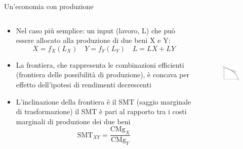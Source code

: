 \documentclass[aspectratio=149,11pt]{beamer}
\begin{document}
\begin{frame}{Un'economia con produzione}
\begin{columns}
\begin{column}{.5\columnwidth}
\begin{itemize}
\item Nel caso più semplice: un input (lavoro, L) che può essere allocato alla
produzione di due beni X e Y:
\begin{equation*}
X = f_X(L_X)\quad  Y = f_Y(L_Y)\quad L = LX + LY
\end{equation*}
\item La frontiera, che rappresenta le combinazioni efficienti (\alert{frontiera delle
possibilità di produzione}), è concava per effetto dell’ipotesi di rendimenti
decrescenti
\item L’inclinazione della frontiera è il SMT (\alert{saggio marginale di trasformazione})
il SMT è pari al rapporto tra i costi marginali di produzione dei due beni
\begin{equation*}
\text{SMT}_{XY}=\frac{\text{CMg}_X}{\text{CMg}_Y}
\end{equation*}
\end{itemize}
\end{column}


\begin{column}{.5\columnwidth}
\begin{figure}[htbp]
\centering
\includegraphics[height=5cm]{./figure/frontiere-1.pdf}
\end{figure}
\end{column}
\end{columns}
\end{frame}
\end{document}
